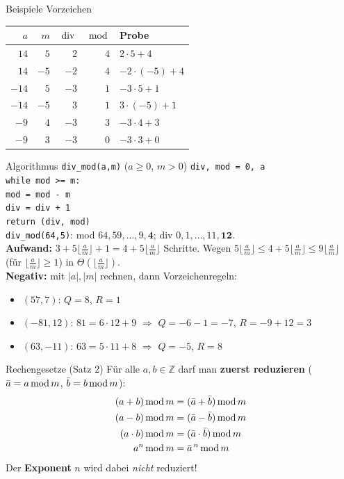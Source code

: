 \documentclass[a4paper, fontsize=7pt]{scrartcl}
\def\Z{\mathbb{Z}}  %
\newcommand{\Div}{\mskip3mu\mathrm{div}\mskip3mu}
\newcommand{\Mod}{\mskip3mu\mathrm{mod}\mskip3mu}
\begin{document}
\begin{subbox}{Beispiele Vorzeichen}
\begin{center}
\begin{tabular}{@{}rr|rr|l@{}}
$a$ & $m$ & $\Div$ & $\Mod$ & Probe \\ \hline
$14$ & $5$ & $2$ & $4$ & $2 \cdot 5 + 4$ \\
$14$ & $-5$ & $-2$ & $4$ & $-2 \cdot (-5) + 4$ \\
$-14$ & $5$ & $-3$ & $1$ & $-3 \cdot 5 + 1$ \\
$-14$ & $-5$ & $3$ & $1$ & $3 \cdot (-5) + 1$ \\
$-9$ & $4$ & $-3$ & $3$ & $-3 \cdot 4 + 3$ \\
$-9$ & $3$ & $-3$ & $0$ & $-3 \cdot 3 + 0$
\end{tabular}
\end{center}
\end{subbox}

\begin{subbox}{Algorithmus \texttt{div\_mod(a,m)} ($a \ge 0$, $m > 0$)}
\texttt{div, mod = 0, a}\\
\texttt{while mod >= m:}\\
\phantom{xx}\texttt{mod = mod - m}\\
\phantom{xx}\texttt{div = div + 1}\\
\texttt{return (div, mod)}\\[2pt]
\texttt{div\_mod(64,5)}: mod $64, 59, \ldots, 9, \mathbf{4}$; div
$0, 1, \ldots, 11, \mathbf{12}$.\\
\textbf{Aufwand:} $3 + 5\lfloor\frac{a}{m}\rfloor + 1 = 4 +
5\lfloor\frac{a}{m}\rfloor$ Schritte. Wegen
$5\lfloor\frac{a}{m}\rfloor \le 4 + 5\lfloor\frac{a}{m}\rfloor \le
9\lfloor\frac{a}{m}\rfloor$ (für $\lfloor\frac{a}{m}\rfloor \ge 1$) in
$\Theta(\lfloor\frac{a}{m}\rfloor)$.\\
\textbf{Negativ:} mit $|a|, |m|$ rechnen, dann Vorzeichenregeln:
\begin{itemize}
    \item $(57, 7)$: $Q = 8$, $R = 1$
    \item $(-81, 12)$: $81 = 6 \cdot 12 + 9$ $\Rightarrow$ $Q = -6 - 1 = -7$,
          $R = -9 + 12 = 3$
    \item $(63, -11)$: $63 = 5 \cdot 11 + 8$ $\Rightarrow$ $Q = -5$, $R = 8$
\end{itemize}
\end{subbox}

\begin{mainbox}{Rechengesetze (Satz 2)}
Für alle $a, b \in \Z$ darf man \textbf{zuerst reduzieren}
($\bar{a} = a \Mod m$, $\bar{b} = b \Mod m$):
\begin{align*}
(a + b) \Mod m &= (\bar{a} + \bar{b}) \Mod m\\
(a - b) \Mod m &= (\bar{a} - \bar{b}) \Mod m\\
(a \cdot b) \Mod m &= (\bar{a} \cdot \bar{b}) \Mod m\\
a^n \Mod m &= \bar{a}^{\,n} \Mod m
\end{align*}
Der \textbf{Exponent} $n$ wird dabei \emph{nicht} reduziert!
\end{mainbox}
\end{document}
